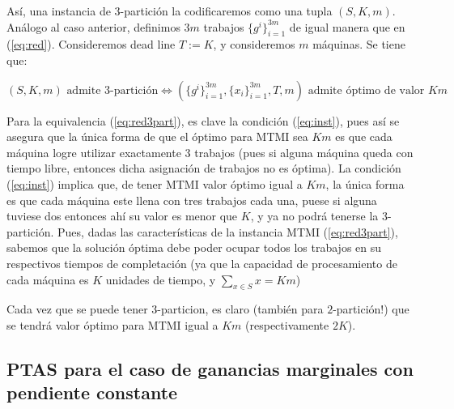 \documentclass[10pt]{article}
\theoremstyle{plain}
\theoremstyle{definition}
\begin{document}
Así, una instancia de $3$-partición la codificaremos como una tupla $(S, K, m)$. Análogo al caso anterior, definimos $3m$ trabajos $\{g^i\}_{i=1}^{3m}$ de igual manera que en (\ref{eq:red}). Consideremos dead line $T:=K$, y consideremos $m$ máquinas. Se tiene que:

\begin{equation}
\label{eq:red3part}
(S, K, m) \text{ admite $3$-partición} \Longleftrightarrow (\{g^i\}_{i=1}^{3m}, \{x_i\}_{i=1}^{3m}, T, m)
\text{ admite óptimo de valor $Km$}
\end{equation}

Para la equivalencia (\ref{eq:red3part}), es clave la condición  (\ref{eq:inst}), pues así se asegura que la única forma de que el óptimo para MTMI sea $Km$ es que cada máquina logre utilizar exactamente 3 trabajos (pues si alguna máquina queda con tiempo libre, entonces dicha asignación de trabajos no es óptima). La condición (\ref{eq:inst}) implica que, de tener MTMI valor óptimo igual a $Km$, la única forma es que cada máquina este llena con tres trabajos cada una, puese si alguna tuviese dos entonces ahí su valor es menor que $K$, y ya no podrá tenerse la 3-partición. Pues, dadas las características de la instancia MTMI (\ref{eq:red3part}), sabemos que la solución óptima debe poder ocupar todos los trabajos en su respectivos tiempos de completación (ya que la capacidad de procesamiento de cada máquina es $K$ unidades de tiempo, y $\sum_{x \in S} x = Km$)

Cada vez que se puede tener 3-particion, es claro (también para $2$-partición!) que se tendrá valor óptimo para MTMI igual a $Km$ (respectivamente $2K$).

\subsection{PTAS para el caso de ganancias marginales con pendiente constante}
\end{document}
